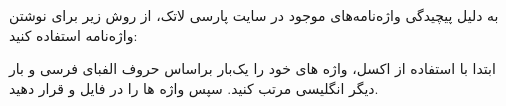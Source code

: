 به دلیل پیچیدگی واژه‌نامه‌های موجود در سایت پارسی لاتک، از روش زیر برای نوشتن واژه‌نامه استفاده کنید:

ابتدا با استفاده از اکسل، واژه های خود را یک‌بار براساس حروف الفبای فرسی و بار دیگر انگلیسی مرتب کنید. سپس واژه ها را در فایل  و  قرار دهید.





 
